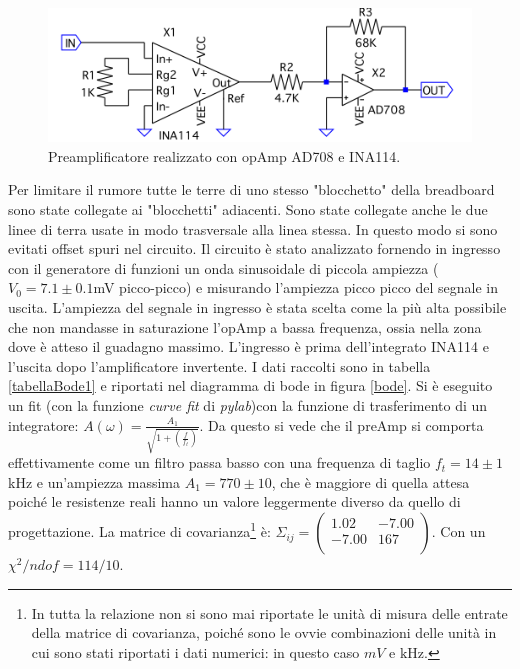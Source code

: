 \documentclass[10pt,a4paper]{article}
\begin{document}
\begin{figure}[!htb]
\centering
\includegraphics[scale=0.5]{preamp.png}
\caption{Preamplificatore realizzato con opAmp AD708 e INA114.\label{preamp}}
\end{figure}


Per limitare il rumore tutte le terre di uno stesso "blocchetto" della breadboard sono state collegate ai "blocchetti" adiacenti. Sono state collegate anche le due linee di terra usate in modo trasversale alla linea stessa. In questo modo si sono evitati offset spuri nel circuito. %
Il circuito è stato analizzato fornendo in ingresso con il generatore di funzioni un onda sinusoidale di piccola ampiezza ($V_0 = 7.1 \pm 0.1$mV picco-picco) e misurando l'ampiezza picco picco del segnale in uscita. L'ampiezza del segnale in ingresso è stata scelta come la più alta possibile che non mandasse in saturazione l'opAmp a bassa frequenza, ossia nella zona dove è atteso il guadagno massimo. L'ingresso è prima dell'integrato INA114 e l'uscita dopo l'amplificatore invertente. %
I dati raccolti sono in tabella \ref{tabellaBode1} e riportati nel diagramma di bode in figura \ref{bode}.
Si è eseguito un fit (con la funzione \emph{curve fit} di \emph{pylab})con la funzione di trasferimento di un integratore: $A(\omega) = \frac{A_1}{\sqrt{1+\left( \frac{f}{f_t} \right) }}$. Da questo si vede che il preAmp si comporta effettivamente come un filtro passa basso con una frequenza di taglio $f_t = 14 \pm 1$kHz e un'ampiezza massima $A_{1} = 770 \pm 10$, che è maggiore di quella attesa poiché le resistenze reali hanno un valore leggermente diverso da quello di progettazione. La matrice di covarianza\footnote{In tutta la relazione non si sono mai riportate le unità di misura delle entrate della matrice di covarianza, poiché sono le ovvie combinazioni delle unità in cui sono stati riportati i dati numerici: in questo caso $mV$ e $\mbox{kHz}$.} è: $\Sigma_{ij} = \left( \begin{array}{cc}
1.02 & -7.00\\ 
-7.00 & 167\\
\end{array} \right)$. Con un $\chi^2/ndof = 114/10$.
\end{document}
